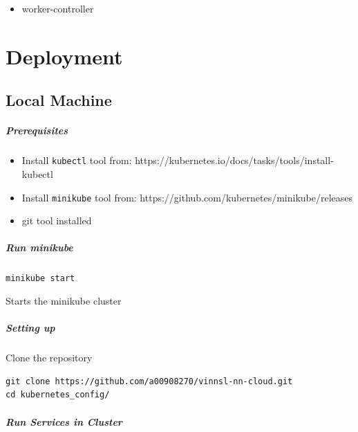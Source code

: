 \begin{itemize}
\tightlist
\item
  worker-controller
\end{itemize}

\chapter{Deployment}\label{deployment}

\section{Local Machine}\label{local-machine}

\paragraph{Prerequisites}\label{prerequisites}

\begin{itemize}
\tightlist
\item
  Install \texttt{kubectl} tool from:
  https://kubernetes.io/docs/tasks/tools/install-kubectl
\item
  Install \texttt{minikube} tool from:
  https://github.com/kubernetes/minikube/releases
\item
  git tool installed
\end{itemize}

\paragraph{Run minikube}\label{run-minikube}

\texttt{minikube\ start}

Starts the minikube cluster

\paragraph{Setting up}\label{setting-up}

Clone the repository

\begin{verbatim}
git clone https://github.com/a00908270/vinnsl-nn-cloud.git
cd kubernetes_config/
\end{verbatim}

\paragraph{Run Services in Cluster}\label{run-services-in-cluster}

